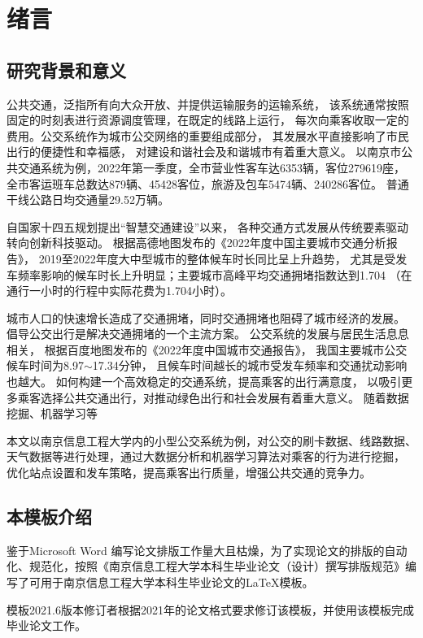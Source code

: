 \section{绪言}
\subsection{研究背景和意义}
公共交通，泛指所有向大众开放、并提供运输服务的运输系统，
该系统通常按照固定的时刻表进行资源调度管理，在既定的线路上运行，
每次向乘客收取一定的费用。公交系统作为城市公交网络的重要组成部分，
其发展水平直接影响了市民出行的便捷性和幸福感，
对建设和谐社会及和谐城市有着重大意义。
以南京市公共交通系统为例，2022年第一季度，全市营业性客车达6353辆，客位279619座，
全市客运班车总数达879辆、45428客位，旅游及包车5474辆、240286客位。
普通干线公路日均交通量29.52万辆\cite{njjt}。


自国家十四五规划提出“智慧交通建设”以来，
各种交通方式发展从传统要素驱动转向创新科技驱动。
根据高德地图发布的《2022年度中国主要城市交通分析报告\cite{x1}》，
2019至2022年度大中型城市的整体候车时长同比呈上升趋势，
尤其是受发车频率影响的候车时长上升明显；主要城市高峰平均交通拥堵指数达到1.704
（在通行一小时的行程中实际花费为1.704小时）。

城市人口的快速增长造成了交通拥堵，同时交通拥堵也阻碍了城市经济的发展。
倡导公交出行是解决交通拥堵的一个主流方案。
公交系统的发展与居民生活息息相关，
根据百度地图发布的《2022年度中国城市交通报告\cite{bd}》，
我国主要城市公交候车时间为8.97$ \sim $17.34分钟，
且候车时间越长的城市受发车频率和交通扰动影响也越大。
如何构建一个高效稳定的交通系统，提高乘客的出行满意度，
以吸引更多乘客选择公共交通出行，对推动绿色出行和社会发展有着重大意义。
随着数据挖掘、机器学习等

本文以南京信息工程大学内的小型公交系统为例，对公交的刷卡数据、线路数据、
天气数据等进行处理，通过大数据分析和机器学习算法对乘客的行为进行挖掘，
优化站点设置和发车策略，提高乘客出行质量，增强公共交通的竞争力。

\subsection{本模板介绍}
鉴于Microsoft Word 编写论文排版工作量大且枯燥，为了实现论文的排版的自动化、规范化，按照《南京信息工程大学本科生毕业论文（设计）撰写排版规范》编写了可用于南京信息工程大学本科生毕业论文的\LaTeX 模板。

模板2021.6版本修订者根据2021年的论文格式要求修订该模板，并使用该模板完成毕业论文工作。